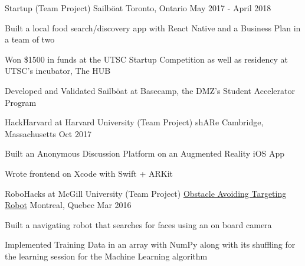 \begin{cventries}
\cventry
    {Startup (Team Project)}
    {Sailböat}
    {Toronto, Ontario}
    {May 2017 - April 2018}
    {
      \begin{cvitems}
        \item {Built a local food search/discovery app with React Native and a Business Plan in a team of two}
        \item {Won \$1500 in funds at the UTSC Startup Competition as well as residency at UTSC's incubator, The HUB}
        \item {Developed and Validated Sailböat at Basecamp, the DMZ's Student Accelerator Program}
      \end{cvitems}
    }
\cventry
    {HackHarvard at Harvard University (Team Project)}
    {shARe}
    {Cambridge, Massachusetts}
    {Oct 2017}
    {
      \begin{cvitems}
        \item {Built an Anonymous Discussion Platform on an Augmented Reality iOS App}
        \item {Wrote frontend on Xcode with Swift + ARKit}
      \end{cvitems}
    }
\cventry
    {RoboHacks at McGill University (Team Project)}
    {\href{https://github.com/PhABC/HeadHunterBots}{Obstacle Avoiding Targeting Robot}}
    {Montreal, Quebec}
    {Mar 2016}
    {
      \begin{cvitems}
        \item {Built a navigating robot that searches for faces using an on board camera}
        \item {Implemented Training Data in an array with NumPy along with its shuffling for the learning session for the Machine Learning algorithm}
      \end{cvitems}
    }
\end{cventries}
